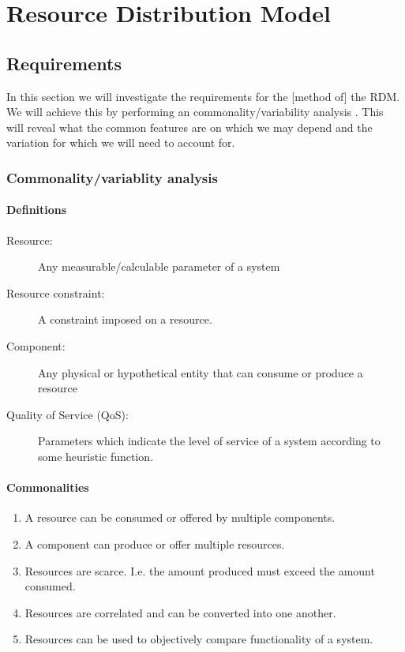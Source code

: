 \newcommand{\rdmid}{1}
\chapter{Resource Distribution Model}
\section{Requirements}
In this section we will investigate the requirements for the [method of] the RDM. We will achieve this by performing an commonality/variability analysis \cite{var_invar}. This will reveal what the common features are on which we may depend and the variation for which we will need to account for.
\subsection{Commonality/variablity analysis}
\subsubsection{Definitions}
\begin{description}
\item[Resource:] Any measurable/calculable parameter of a system
\item[Resource constraint:] A constraint imposed on a resource.
\item[Component:] Any physical or hypothetical entity that can consume or produce a resource
\item[Quality of Service (QoS):] Parameters which indicate the level of service of a system according to some heuristic function.
\end{description}
\subsubsection{Commonalities}
\begin{enumerate}[label=C\rdmid .\arabic*]
\item \label{c:1resource_multiplex} A resource can be consumed or offered by multiple components.
\item \label{c:2component_multiplex} A component can produce or offer multiple resources.
\item \label{c:3scarce} Resources are scarce. I.e. the amount produced must exceed the amount consumed.
\item \label{c:4res_transf} Resources are correlated and can be converted into one another.
\item \label{c:5optimize} Resources can be used to objectively compare functionality of a system.
\end{enumerate}

